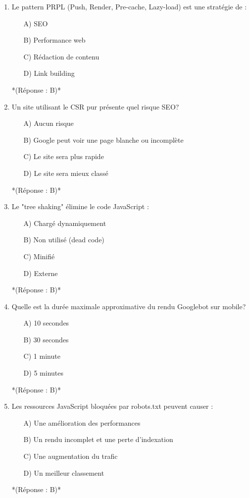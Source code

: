 \documentclass[12pt,a4paper,twoside]{report}
\begin{document}
\begin{enumerate}
\item Le pattern PRPL (Push, Render, Pre-cache, Lazy-load) est une stratégie de :
\begin{itemize}
\item[A)] SEO
\item[B)] Performance web
\item[C)] Rédaction de contenu
\item[D)] Link building
\end{itemize}
*(Réponse : B)*

\item Un site utilisant le CSR pur présente quel risque SEO?
\begin{itemize}
\item[A)] Aucun risque
\item[B)] Google peut voir une page blanche ou incomplète
\item[C)] Le site sera plus rapide
\item[D)] Le site sera mieux classé
\end{itemize}
*(Réponse : B)*

\item Le "tree shaking" élimine le code JavaScript :
\begin{itemize}
\item[A)] Chargé dynamiquement
\item[B)] Non utilisé (dead code)
\item[C)] Minifié
\item[D)] Externe
\end{itemize}
*(Réponse : B)*

\item Quelle est la durée maximale approximative du rendu Googlebot sur mobile?
\begin{itemize}
\item[A)] 10 secondes
\item[B)] 30 secondes
\item[C)] 1 minute
\item[D)] 5 minutes
\end{itemize}
*(Réponse : B)*

\item Les ressources JavaScript bloquées par robots.txt peuvent causer :
\begin{itemize}
\item[A)] Une amélioration des performances
\item[B)] Un rendu incomplet et une perte d'indexation
\item[C)] Une augmentation du trafic
\item[D)] Un meilleur classement
\end{itemize}
*(Réponse : B)*


\end{enumerate}
\end{document}
